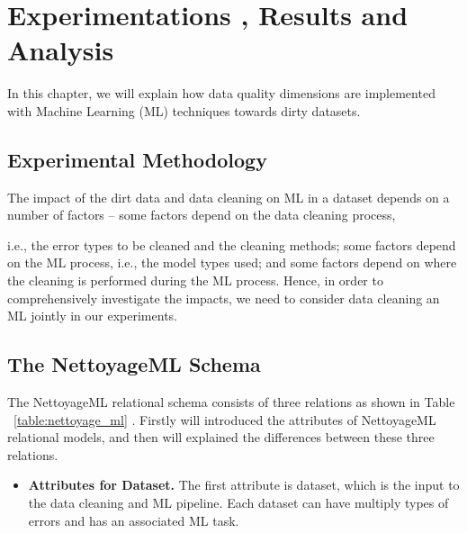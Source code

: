 \chapter{Experimentations , Results and Analysis}

\ifpdf
    \graphicspath{{Chapter4/Figs/Raster/}{Chapter4/Figs/PDF/}{Chapter4/Figs/}}
\else
    \graphicspath{{Chapter4/Figs/Vector/}{Chapter4/Figs/}}
\fi

In this chapter, we will explain how data quality dimensions are implemented with Machine Learning (ML) techniques towards dirty datasets. 

\section{Experimental Methodology}  

The impact of the dirt data and data cleaning on ML in a dataset depends on a number of factors -- some factors depend on the data cleaning process, 

i.e., the error types to be cleaned and the cleaning methods; some factors depend on the ML
process, i.e., the model types used; and some factors depend on where the cleaning is performed during the ML process. Hence, in order to comprehensively investigate the impacts, we need to consider data cleaning an ML jointly in our experiments.

\section{The NettoyageML Schema}  

The NettoyageML relational schema consists of three relations as shown in Table ~\ref{table:nettoyage_ml} . Firstly will introduced the attributes of NettoyageML relational models, and then will explained 
the differences between these three relations.


\begin{itemize}
	\item {
		\textbf{Attributes for Dataset.} The first attribute is dataset, which is the input to the data cleaning and ML pipeline. Each dataset can have multiply types of errors and has an associated ML task. 
	}
\end{itemize}


